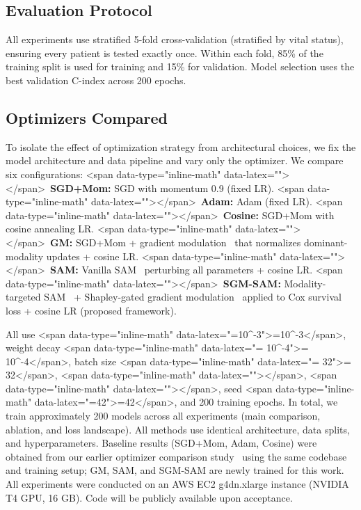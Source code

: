 \documentclass[10pt]{article}\usepackage[utf8]{inputenc}\usepackage[T1]{fontenc}\usepackage{amsmath,amssymb,amsfonts,bm}\usepackage{booktabs}\usepackage{multirow}\usepackage{array}\usepackage{graphicx}\usepackage{algorithm}\usepackage{algorithmic}\usepackage{xcolor}\usepackage[margin=1in]{geometry}\usepackage{microtype}
\begin{document}
\subsection{Evaluation Protocol}
All experiments use stratified 5-fold cross-validation (stratified by vital status), ensuring every patient is tested exactly once. Within each fold, 85\% of the training split is used for training and 15\% for validation. Model selection uses the best validation C-index across 200 epochs.

\subsection{Optimizers Compared}
To isolate the effect of optimization strategy from architectural choices, we fix the model architecture and data pipeline and vary only the optimizer. We compare six configurations:
<span data-type="inline-math" data-latex="\bullet">\bullet</span>~\textbf{SGD+Mom:} SGD with momentum 0.9 (fixed LR).
<span data-type="inline-math" data-latex="\bullet">\bullet</span>~\textbf{Adam:} Adam (fixed LR).
<span data-type="inline-math" data-latex="\bullet">\bullet</span>~\textbf{Cosine:} SGD+Mom with cosine annealing LR.
<span data-type="inline-math" data-latex="\bullet">\bullet</span>~\textbf{GM:} SGD+Mom + gradient modulation~\cite{peng2022balanced} that normalizes dominant-modality updates + cosine LR.
<span data-type="inline-math" data-latex="\bullet">\bullet</span>~\textbf{SAM:} Vanilla SAM~\cite{foret2021sam} perturbing all parameters + cosine LR.
<span data-type="inline-math" data-latex="\bullet">\bullet</span>~\textbf{SGM-SAM:} Modality-targeted SAM~\cite{rajoli2025msam} + Shapley-gated gradient modulation~\cite{peng2022balanced} applied to Cox survival loss + cosine LR (proposed framework).

All use <span data-type="inline-math" data-latex="=10^{-3}">=10^{-3}</span>, weight decay <span data-type="inline-math" data-latex="= 10^{-4}">= 10^{-4}</span>, batch size <span data-type="inline-math" data-latex="= 32">= 32</span>, <span data-type="inline-math" data-latex=""></span>, <span data-type="inline-math" data-latex=""></span>, seed <span data-type="inline-math" data-latex="=42">=42</span>, and 200 training epochs. In total, we train approximately 200 models across all experiments (main comparison, ablation, and loss landscape). All methods use identical architecture, data splits, and hyperparameters. Baseline results (SGD+Mom, Adam, Cosine) were obtained from our earlier optimizer comparison study~\cite{anonymous2026adaptive} using the same codebase and training setup; GM, SAM, and SGM-SAM are newly trained for this work. All experiments were conducted on an AWS EC2 g4dn.xlarge instance (NVIDIA T4 GPU, 16 GB). Code will be publicly available upon acceptance.
\end{document}

